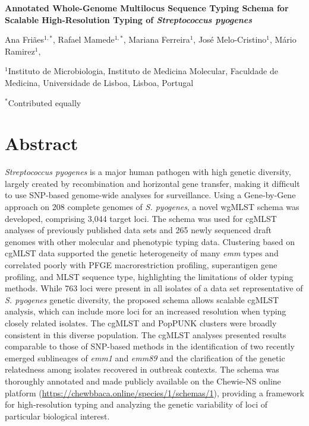 \cleardoublepage 

\begin{center}
\large
\textbf{Annotated Whole-Genome Multilocus Sequence Typing Schema for Scalable High-Resolution Typing of \textit{Streptococcus pyogenes}}
\end{center}

Ana Friães$^{1,*}$, 
Rafael Mamede$^{1,*}$, 
Mariana Ferreira$^1$,
José Melo-Cristino$^1$, 
Mário Ramirez$^1$,

$^1$Instituto de Microbiologia, Instituto de Medicina Molecular, Faculdade de Medicina, Universidade de Lisboa, Lisboa, Portugal 

$^*$Contributed equally

\section{Abstract}

\textit{Streptococcus pyogenes} is a major human pathogen with high genetic diversity, largely created by recombination and horizontal gene transfer, making it difﬁcult to use \ac{SNP}-based genome-wide analyses for surveillance. Using a Gene-by-Gene approach on 208 complete genomes of \textit{S. pyogenes}, a novel \ac{wgMLST} schema was developed, comprising 3,044 target loci. The schema was used for \ac{cgMLST} analyses of previously published data sets and 265 newly sequenced draft genomes with other molecular and phenotypic typing data. Clustering based on \ac{cgMLST} data supported the genetic heterogeneity of many \textit{emm} types and correlated poorly with \ac{PFGE} macrorestriction proﬁling, superantigen gene proﬁling, and \ac{MLST} sequence type, highlighting the limitations of older typing methods. While 763 loci were present in all isolates of a data set representative of \textit{S. pyogenes} genetic diversity, the proposed schema allows scalable \ac{cgMLST} analysis, which can include more loci for an increased resolution when typing closely related isolates. The \ac{cgMLST} and PopPUNK clusters were broadly consistent in this diverse population. The \ac{cgMLST} analyses presented results comparable to those of \ac{SNP}-based methods in the identiﬁcation of two recently emerged sublineages of \textit{emm1} and \textit{emm89} and the clariﬁcation of the genetic relatedness among isolates recovered in outbreak contexts. The schema was thoroughly annotated and made publicly available on the \ac{Chewie-NS} online platform (\url{https://chewbbaca.online/species/1/schemas/1}), providing a framework for high-resolution typing and analyzing the genetic variability of loci of particular biological interest.

